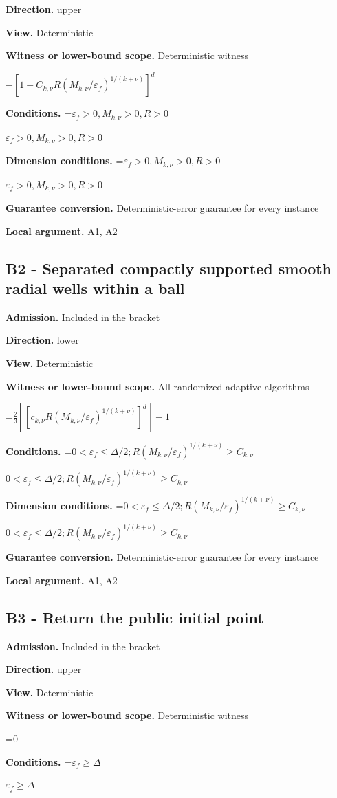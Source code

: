 \documentclass[10pt,a4paper]{article}
\newcommand{\AtlasMath}[1]{\par\begingroup\centering\setbox0=\hbox{$\displaystyle #1$}\ifdim\wd0>1.4\linewidth\typeout{ATLAS WIDE FORMULA: \the\wd0}\fi\ifdim\wd0>\linewidth\resizebox{\linewidth}{!}{\box0}\else\box0\fi\par\endgroup}
\newcommand{\AtlasInlineMath}[1]{\begingroup\setbox0=\hbox{$#1$}\ifdim\wd0>.4\linewidth\endgroup\AtlasMath{#1}\else\endgroup$#1$\fi}
\begin{document}
\textbf{Direction.} upper

\textbf{View.} Deterministic

\textbf{Witness or lower-bound scope.} Deterministic witness

\AtlasMath{[1+C_{k,\nu}R(M_{k,\nu}/\varepsilon_f)^{1/(k+\nu)}]^d}
\textbf{Conditions.} \AtlasInlineMath{\varepsilon_f>0,M_{k,\nu}>0,R>0}

\textbf{Dimension conditions.} \AtlasInlineMath{\varepsilon_f>0,M_{k,\nu}>0,R>0}

\textbf{Guarantee conversion.} Deterministic-error guarantee for every instance

\textbf{Local argument.} A1, A2

\subsection{B2 - Separated compactly supported smooth radial wells within a ball}
\textbf{Admission.} Included in the bracket

\textbf{Direction.} lower

\textbf{View.} Deterministic

\textbf{Witness or lower-bound scope.} All randomized adaptive algorithms

\AtlasMath{\frac23\left\lfloor[c_{k,\nu}R(M_{k,\nu}/\varepsilon_f)^{1/(k+\nu)}]^d\right\rfloor-1}
\textbf{Conditions.} \AtlasInlineMath{0<\varepsilon_f\le \Delta/2;R(M_{k,\nu}/\varepsilon_f)^{1/(k+\nu)}\ge C_{k,\nu}}

\textbf{Dimension conditions.} \AtlasInlineMath{0<\varepsilon_f\le \Delta/2;R(M_{k,\nu}/\varepsilon_f)^{1/(k+\nu)}\ge C_{k,\nu}}

\textbf{Guarantee conversion.} Deterministic-error guarantee for every instance

\textbf{Local argument.} A1, A2

\subsection{B3 - Return the public initial point}
\textbf{Admission.} Included in the bracket

\textbf{Direction.} upper

\textbf{View.} Deterministic

\textbf{Witness or lower-bound scope.} Deterministic witness

\AtlasMath{0}
\textbf{Conditions.} \AtlasInlineMath{\varepsilon_f\ge \Delta}
\end{document}
